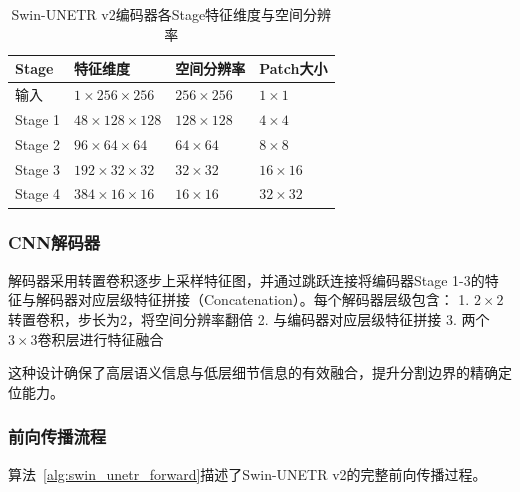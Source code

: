 \documentclass[12pt, a4paper]{article}
\begin{document}
\begin{table}[H]
    \centering
    \caption{Swin-UNETR v2编码器各Stage特征维度与空间分辨率}
    \label{tab:swin_stages}
    \begin{tabular}{@{}llll@{}}
        \toprule
        \textbf{Stage} & \textbf{特征维度} & \textbf{空间分辨率} & \textbf{Patch大小} \\
        \midrule
        输入 & $1{\times}256{\times}256$ & $256{\times}256$ & $1{\times}1$ \\
        Stage 1 & $48{\times}128{\times}128$ & $128{\times}128$ & $4{\times}4$ \\
        Stage 2 & $96{\times}64{\times}64$ & $64{\times}64$ & $8{\times}8$ \\
        Stage 3 & $192{\times}32{\times}32$ & $32{\times}32$ & $16{\times}16$ \\
        Stage 4 & $384{\times}16{\times}16$ & $16{\times}16$ & $32{\times}32$ \\
        \bottomrule
    \end{tabular}
\end{table}

\subsubsection{CNN解码器}

解码器采用转置卷积逐步上采样特征图，并通过跳跃连接将编码器Stage 1-3的特征与解码器对应层级特征拼接（Concatenation）。每个解码器层级包含：
1. $2{\times}2$转置卷积，步长为2，将空间分辨率翻倍
2. 与编码器对应层级特征拼接
3. 两个$3{\times}3$卷积层进行特征融合

这种设计确保了高层语义信息与低层细节信息的有效融合，提升分割边界的精确定位能力。

\subsubsection{前向传播流程}

算法~\ref{alg:swin_unetr_forward}描述了Swin-UNETR v2的完整前向传播过程。
\end{document}
